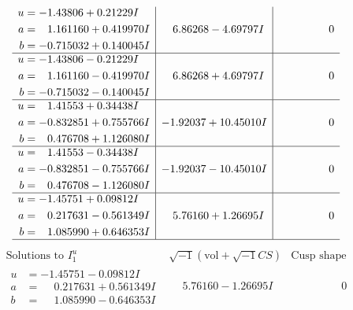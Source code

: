 \documentclass[1p]{elsarticle_modified}
\theoremstyle{definition}
\newcommand{\I}{\sqrt{-1}}
\begin{document}
$$\begin{array}{c|c|c}
\begin{aligned}
u &= -1.43806 + 0.21229 I \\
a &= \phantom{-}1.161160 + 0.419970 I \\
b &= -0.715032 + 0.140045 I\end{aligned}
 & \phantom{-}6.86268 - 4.69797 I & \phantom{-0.000000 } 0 \\ \hline\begin{aligned}
u &= -1.43806 - 0.21229 I \\
a &= \phantom{-}1.161160 - 0.419970 I \\
b &= -0.715032 - 0.140045 I\end{aligned}
 & \phantom{-}6.86268 + 4.69797 I & \phantom{-0.000000 } 0 \\ \hline\begin{aligned}
u &= \phantom{-}1.41553 + 0.34438 I \\
a &= -0.832851 + 0.755766 I \\
b &= \phantom{-}0.476708 + 1.126080 I\end{aligned}
 & -1.92037 + 10.45010 I & \phantom{-0.000000 } 0 \\ \hline\begin{aligned}
u &= \phantom{-}1.41553 - 0.34438 I \\
a &= -0.832851 - 0.755766 I \\
b &= \phantom{-}0.476708 - 1.126080 I\end{aligned}
 & -1.92037 - 10.45010 I & \phantom{-0.000000 } 0 \\ \hline\begin{aligned}
u &= -1.45751 + 0.09812 I \\
a &= \phantom{-}0.217631 - 0.561349 I \\
b &= \phantom{-}1.085990 + 0.646353 I\end{aligned}
 & \phantom{-}5.76160 + 1.26695 I & \phantom{-0.000000 } 0\\
 \hline 
 \end{array}$$\newpage$$\begin{array}{c|c|c}  
\text{Solutions to }I^u_{1}& \I (\text{vol} + \sqrt{-1}CS) & \text{Cusp shape}\\
 \hline 
\begin{aligned}
u &= -1.45751 - 0.09812 I \\
a &= \phantom{-}0.217631 + 0.561349 I \\
b &= \phantom{-}1.085990 - 0.646353 I\end{aligned}
 & \phantom{-}5.76160 - 1.26695 I & \phantom{-0.000000 } 0 \\ \hline\begin{aligned}

\end{aligned}
\end{array}$$
\end{document}
